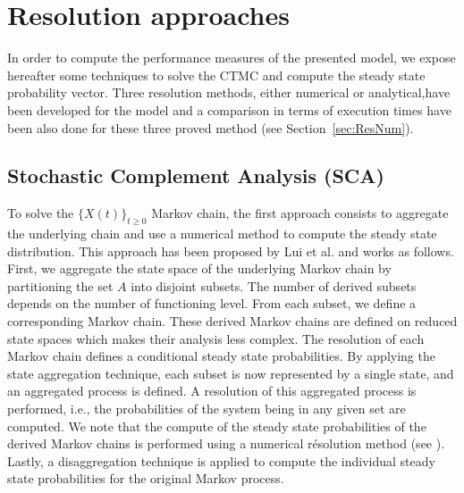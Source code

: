 \documentclass[conference]{IEEEtran}
\begin{document}
\section{Resolution approaches} %
\label{sec:ResModel}
In order to compute the performance measures of the presented model, we expose hereafter some techniques to solve the CTMC and compute
the steady state probability vector. Three resolution methods, either numerical or analytical,have been developed for the model and a comparison in terms of execution times have been also done for these three proved method (see Section~\ref{sec:ResNum}).

\subsection{Stochastic Complement Analysis (SCA)} %

\label{sec:SCA}
To solve the $\{X(t)\}_{t \geq 0}$ Markov chain, the first approach consists to aggregate the underlying chain and use a numerical method to compute
the steady state distribution. This approach has been proposed by Lui et al. \cite{lui1999stochastic}
and works as follows. First, we aggregate the state space of the underlying Markov chain by partitioning the set $A$ into disjoint subsets.
The number of derived subsets depends on the number of functioning level. From each subset, we define a corresponding Markov chain.
These derived Markov chains are defined on reduced state spaces which makes their analysis less complex.
The resolution of each Markov chain defines a conditional steady state probabilities.
By applying the state aggregation technique, each subset is now represented by a single state, and an aggregated process is defined.
A resolution of this aggregated process is performed, i.e., the probabilities of the system being in any given set are computed.
We note that the compute of the steady state probabilities of the derived Markov chains is performed using a numerical résolution method (see \cite{Stew95}).
Lastly, a disaggregation technique is applied to compute the individual steady state probabilities for the original Markov process.

\end{document}
